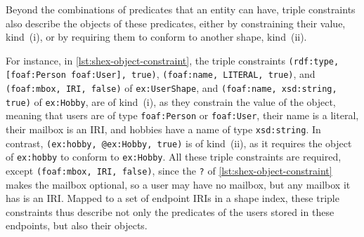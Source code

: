 Beyond the combinations of predicates that an entity can have, triple constraints also describe the objects of these predicates,
either by constraining their value, kind~(i), or by requiring them to conform to another shape, kind~(ii).





For instance, in \cref{lst:shex-object-constraint}, the triple constraints
\texttt{(rdf:type, [foaf:Person foaf:User], true)}, \texttt{(foaf:name, LITERAL, true)}, and
\texttt{(foaf:mbox, IRI, false)} of \texttt{ex:UserShape}, and
\texttt{(foaf:name, xsd:string, true)} of \texttt{ex:Hobby}, are of kind~(i),
as they constrain the value of the object,
meaning that users are of type \texttt{foaf:Person} or \texttt{foaf:User}, their name is a literal, their mailbox is an \ac{IRI}, and hobbies have a name of type \texttt{xsd:string}.
In contrast, \texttt{(ex:hobby, @ex:Hobby, true)} is of kind~(ii),
as it requires the object of \texttt{ex:hobby} to conform to \texttt{ex:Hobby}.
All these triple constraints are required, except \texttt{(foaf:mbox, IRI, false)},
since the \texttt{?} of \cref{lst:shex-object-constraint} makes the mailbox optional,
so a user may have no mailbox, but any mailbox it has is an \ac{IRI}.
Mapped to a set of endpoint \acp{IRI} in a shape index, these triple constraints thus describe not only the predicates of the users stored in these endpoints, but also their objects.
